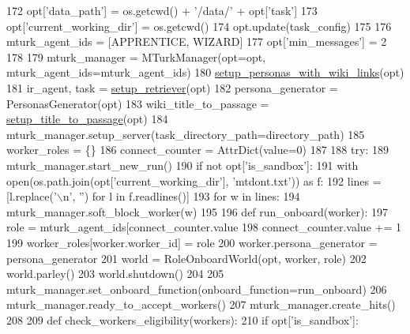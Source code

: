 \begin{DoxyCode}
172         opt[\textcolor{stringliteral}{'data\_path'}] = os.getcwd() + \textcolor{stringliteral}{'/data/'} + opt[\textcolor{stringliteral}{'task'}]
173         opt[\textcolor{stringliteral}{'current\_working\_dir'}] = os.getcwd()
174     opt.update(task\_config)
175 
176     mturk\_agent\_ids = [APPRENTICE, WIZARD]
177     opt[\textcolor{stringliteral}{'min\_messages'}] = 2
178 
179     mturk\_manager = MTurkManager(opt=opt, mturk\_agent\_ids=mturk\_agent\_ids)
180     \hyperlink{namespaceparlai_1_1mturk_1_1tasks_1_1wizard__of__wikipedia_1_1run_a5c16caa932230f93c418facd793be473}{setup\_personas\_with\_wiki\_links}(opt)
181     ir\_agent, task = \hyperlink{namespaceparlai_1_1mturk_1_1tasks_1_1wizard__of__wikipedia_1_1run_a22eb017ecd8f1a211fc5aac511d3102e}{setup\_retriever}(opt)
182     persona\_generator = PersonasGenerator(opt)
183     wiki\_title\_to\_passage = \hyperlink{namespaceparlai_1_1mturk_1_1tasks_1_1wizard__of__wikipedia_1_1run_a59836c3be93d4b491fa9ddecbb4e83c0}{setup\_title\_to\_passage}(opt)
184     mturk\_manager.setup\_server(task\_directory\_path=directory\_path)
185     worker\_roles = \{\}
186     connect\_counter = AttrDict(value=0)
187 
188     \textcolor{keywordflow}{try}:
189         mturk\_manager.start\_new\_run()
190         \textcolor{keywordflow}{if} \textcolor{keywordflow}{not} opt[\textcolor{stringliteral}{'is\_sandbox'}]:
191             with open(os.path.join(opt[\textcolor{stringliteral}{'current\_working\_dir'}], \textcolor{stringliteral}{'mtdont.txt'})) \textcolor{keyword}{as} f:
192                 lines = [l.replace(\textcolor{stringliteral}{'\(\backslash\)n'}, \textcolor{stringliteral}{''}) \textcolor{keywordflow}{for} l \textcolor{keywordflow}{in} f.readlines()]
193                 \textcolor{keywordflow}{for} w \textcolor{keywordflow}{in} lines:
194                     mturk\_manager.soft\_block\_worker(w)
195 
196         \textcolor{keyword}{def }run\_onboard(worker):
197             role = mturk\_agent\_ids[connect\_counter.value %
198             connect\_counter.value += 1
199             worker\_roles[worker.worker\_id] = role
200             worker.persona\_generator = persona\_generator
201             world = RoleOnboardWorld(opt, worker, role)
202             world.parley()
203             world.shutdown()
204 
205         mturk\_manager.set\_onboard\_function(onboard\_function=run\_onboard)
206         mturk\_manager.ready\_to\_accept\_workers()
207         mturk\_manager.create\_hits()
208 
209         \textcolor{keyword}{def }check\_workers\_eligibility(workers):
210             \textcolor{keywordflow}{if} opt[\textcolor{stringliteral}{'is\_sandbox'}]:

\end{DoxyCode}
